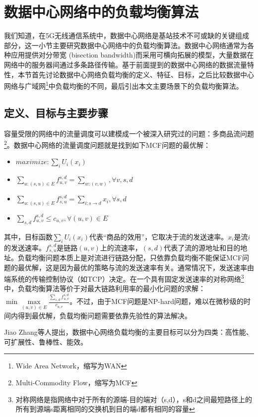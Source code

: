 \section{数据中心网络中的负载均衡算法}
我们知道，在5G无线通信系统中，数据中心网络是基站技术不可或缺的关键组成部分，这一小节主要研究数据中心网络中的负载均衡算法。数据中心网络通常为各种应用提供对分带宽 (bisection bandwidth)而采用可横向拓展的模型\cite{zhang2018survey}，大量数据在网络中的服务器间通过多条路径传输。基于前面提到的数据中心网络的数据流量特性，本节首先讨论数据中心网络负载均衡的定义、特征、目标，之后比较数据中心网络与广域网\footnote{Wide Area Network，缩写为WAN}中负载均衡的不同，最后引出本文主要场景下的负载均衡算法。
\subsection{定义、目标与主要步骤}
容量受限的网络中的流量调度可以建模成一个被深入研究过的问题：多商品流问题\footnote{Multi-Commodity Flow，缩写为MCF}。数据中心网络的流量调度问题就是找到如下MCF问题的最优解：
\begin{itemize}
    \item $ maximize: \sum\limits_{i}U_i(x_i)$
    \item $\sum\limits_{u:(s,u) \in E}f_{u,v}^{s,d} = \sum\limits_{w:(v,w)}, \forall v,s,d$
    \item $\sum\limits_{u:(s,u) \in E}f_{s,u}^{s,d} = \sum\limits_{i:s \rightarrow d}x_i, \forall s,d $
    \item $\sum\limits_{s,d}f_{u,v}^{s,d} \leq c_{u,v}, \forall (u,v) \in E $
\end{itemize}

其中，目标函数$\sum\limits_{i}U_i(x_i)$代表“商品的效用”，它取决于流的发送速率。$x_i$是流$i$的发送速率。$f_{s,u}^{s,d}$是链路$(u,v)$上的流速率，$(s,d)$代表了流的源地址和目的地址。负载均衡问题本质上是对流进行链路分配，只依靠负载均衡不能保证MCF问题的最优解，这是因为最优的策略与流的发送速率有关。通常情况下，发送速率由端系统的传输控制协议（如TCP）决定。在一个具有固定发送速率的对称网络\footnote{对称网络是指网络中对于所有的源端-目的端对（s,d），s和d之间最短路径上的所有到源端s距离相同的交换机到目的端d都有相同的容量}中，负载均衡算法等价于对最大链路利用率的最小化问题的求解：$\min \max\limits_{(u,v) \in E} \frac{\sum\limits_{s,d}f_{u,v}^{s,d}}{c_{u,v}} $。不过，由于MCF问题是NP-hard问题，难以在微秒级的时间内得到最优解，负载均衡问题需要依靠先验性的算法解决。

Jiao Zhang等人\cite{zhang2018survey}提出，数据中心网络负载均衡的主要目标可以分为四类：高性能、可扩展性、鲁棒性、能效。

